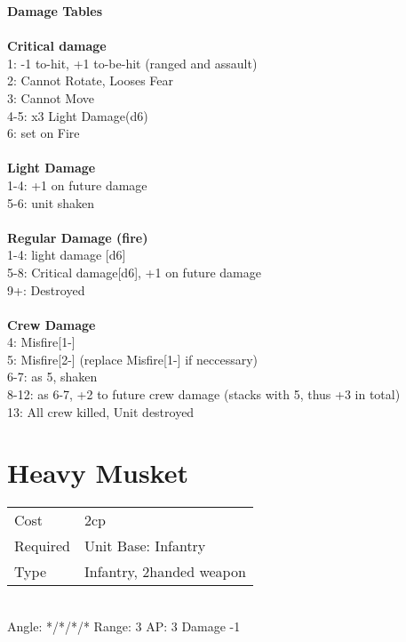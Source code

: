 {\bf Damage Tables} \\
\ \\ {\bf Critical damage } \\
1: -1 to-hit, +1 to-be-hit (ranged and assault) \\
2: Cannot Rotate, Looses Fear \\
3: Cannot Move \\
4-5: x3 Light Damage(d6) \\
6: set on Fire \\
\ \\ {\bf Light Damage } \\
1-4: +1 on future damage \\
5-6: unit shaken \\
\ \\ {\bf Regular Damage (fire) } \\
1-4: light damage [d6] \\
5-8: Critical damage[d6], +1 on future damage \\
9+: Destroyed \\
\ \\ {\bf Crew Damage } \\
4: Misfire[1-] \\
5: Misfire[2-] (replace Misfire[1-] if neccessary) \\
6-7: as 5, shaken \\
8-12: as 6-7, +2 to future crew damage (stacks with 5, thus +3 in total) \\
13: All crew killed, Unit destroyed \\









\pagebreak\section{ Heavy Musket }

\begin{tabular}{ll}
    Cost & 2cp \\
    Required & Unit Base: Infantry\\
    Type & Infantry, 2handed weapon\\
\end{tabular}
\ \\
\indent Angle: */*/*/* Range: 3  AP: 3 Damage -1 \\

\ \\

